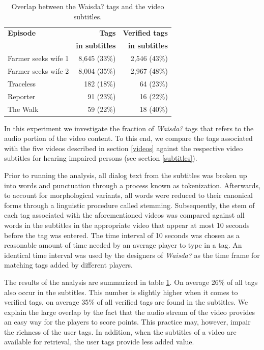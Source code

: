 \begin{table}[tb]
\centering
\begin{footnotesize}
\begin{tabular*}{\columnwidth}{@{\extracolsep{\fill}}lrr}
\toprule
 \textbf{Episode} \T & \textbf{Tags} &\textbf{Verified tags}\\
 \B & \textbf{in subtitles} & \textbf{in subtitles}\\
\midrule
Farmer seeks wife 1 \T \B & 8,645 (33\%)& 2,546 (43\%)\\
Farmer seeks wife 2 \B &8,004 (35\%)&  2,967 (48\%)\\
Traceless \B & 182 (18\%)& 64 (23\%)\\
Reporter \B & 91 (23\%) &  16 (22\%)\\
The Walk \B & 59 (22\%) & 18 (40\%)\\
\bottomrule
\end{tabular*}
\end{footnotesize}
\caption{Overlap between the Waisda? tags and the video subtitles.}
\label{table:subtitles}
\end{table}

In this experiment we investigate the fraction of \emph{Waisda?} tags that refers to
the audio portion of the video content. To this end, we compare the tags
associated with the five videos described in section \ref{videos} against the
respective video subtitles for hearing impaired persons (see section
\ref{subtitles}). 

Prior to running the analysis, all dialog text from the subtitles was broken
up into words and punctuation through a process known as
tokenization. Afterwards, to account for morphological variants, all
words were reduced to their canonical forms through a linguistic procedure
called stemming. Subsequently, the stem of each tag associated with the
aforementioned videos was compared against all words in the subtitles in the
appropriate video that appear at most 10 seconds before the tag was entered.
The time interval of 10 seconds was chosen as a reasonable amount of time
needed by an average player to type in a tag. An identical time interval was
used by the designers of \emph{Waisda?} as the time frame for matching tags added by
different players.

The results of the analysis are summarized in table \ref{table:subtitles}. On
average 26\% of all tags also occur in the subtitles. This number is slightly
higher when it comes to verified tags, on average 35\% of all verified tags
are found in the subtitles. We explain the large overlap by the fact that the
audio stream of the video provides an easy way for the players to score
points. This practice may, however, impair the richness of the user tags. In
addition, when the subtitles of a video are available for retrieval, the user
tags provide less added value.

